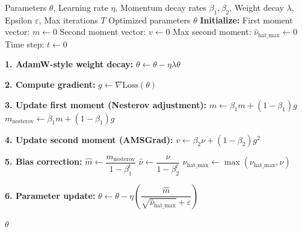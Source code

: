 \documentclass{article}
\begin{document}
\begin{algorithm}[H]
\caption{Nova Optimizer}
\label{alg:nova}
\begin{algorithmic}[1]
\Require Parameters $\theta$, Learning rate $\eta$, Momentum decay rates $\beta_1, \beta_2$, Weight decay $\lambda$, Epsilon $\varepsilon$, Max iterations $T$
\Ensure Optimized parameters $\theta$
\State \textbf{Initialize:}
\State \hspace{0.5cm} First moment vector: $m \gets 0$
\State \hspace{0.5cm} Second moment vector: $v \gets 0$
\State \hspace{0.5cm} Max second moment: $\hat{\nu}_{\text{hat\_max}} \gets 0$
\State \hspace{0.5cm} Time step: $t \gets 0$

    \State \textbf{1. AdamW-style weight decay:}
    \State \hspace{0.5cm} $\theta \gets \theta - \eta \lambda \theta$
    
    \State \textbf{2. Compute gradient:}
    \State \hspace{0.5cm} $g \gets \nabla \text{Loss}(\theta)$
    
    \State \textbf{3. Update first moment (Nesterov adjustment):}
    \State \hspace{0.5cm} $m \gets \beta_1 m + (1 - \beta_1) g$
    \State \hspace{0.5cm} $m_{\text{nesterov}} \gets \beta_1 m + (1 - \beta_1) g$
    
    \State \textbf{4. Update second moment (AMSGrad):}
    \State \hspace{0.5cm} $v \gets \beta_2 \nu + (1 - \beta_2) g^2$
    
    \State \textbf{5. Bias correction:}
    \State \hspace{0.5cm} $\hat{m} \gets \dfrac{m_{\text{nesterov}}}{1 - \beta_1^t}$
    \State \hspace{0.5cm} $\hat{\nu} \gets \dfrac{\nu}{1 - \beta_2^t}$
    \State \hspace{0.5cm} $\nu_{\text{hat\_max}} \gets \max(\nu_{\text{hat\_max}}, \hat{\nu})$
    
    \State \textbf{6. Parameter update:}
    \State \hspace{0.5cm} $\theta \gets \theta - \eta \left(\dfrac{\hat{m}}{\sqrt{\hat{\nu}_{\text{hat\_max}}} + \varepsilon}\right)$
\EndFor

\State \Return $\theta$
\end{algorithmic}
\end{algorithm}
\end{document}
